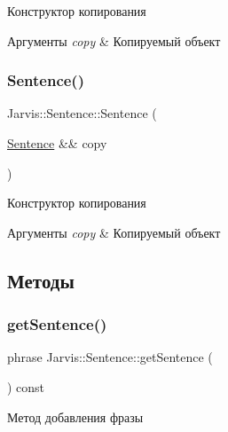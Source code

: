 Конструктор копирования 


\begin{DoxyParams}{Аргументы}
{\em copy} & Копируемый объект \\
\hline
\end{DoxyParams}
\mbox{\label{classJarvis_1_1Sentence_af852c6a73ee0411f4c0f78ed68f97bd3}} 
\subsubsection{\texorpdfstring{Sentence()}{Sentence()}\hspace{0.1cm}{\footnotesize\ttfamily [3/3]}}
{\footnotesize\ttfamily Jarvis\+::\+Sentence\+::\+Sentence (\begin{DoxyParamCaption}\item[{\hyperlink{classJarvis_1_1Sentence}{Sentence} \&\&}]{copy }\end{DoxyParamCaption})}



Конструктор копирования 


\begin{DoxyParams}{Аргументы}
{\em copy} & Копируемый объект \\
\hline
\end{DoxyParams}


\subsection{Методы}
\mbox{\label{classJarvis_1_1Sentence_a480b97ff340eba0a4dcb505aefa26d40}} 
\subsubsection{\texorpdfstring{get\+Sentence()}{getSentence()}}
{\footnotesize\ttfamily phrase Jarvis\+::\+Sentence\+::get\+Sentence (\begin{DoxyParamCaption}{ }\end{DoxyParamCaption}) const}



Метод добавления фразы 


